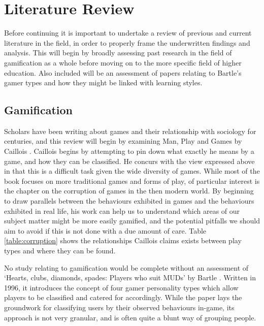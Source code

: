 \documentclass{article}
\begin{document}
\section{Literature Review}
Before continuing it is important to undertake a review of previous and current literature in the field, in order to properly frame the underwritten findings and analysis. This will begin by broadly assessing past research in the field of gamification as a whole before moving on to the more specific field of higher education. Also included will be an assessment of papers relating to Bartle's gamer types and how they might be linked with learning styles.

\subsection{Gamification}
Scholars have been writing about games and their relationship with sociology for centuries, and this review will begin by examining Man, Play and Games by Caillois \cite{caillois1961man}. Caillois begins by attempting to pin down what exactly he means by a game, and how they can be classified. He concurs with the view expressed above in that this is a difficult task given the wide diversity of games. While most of the book focuses on more traditional games and forms of play, of particular interest is the chapter on the corruption of games in the then modern world. By beginning to draw parallels between the behaviours exhibited in games and the behaviours exhibited in real life, his work can help us to understand which areas of our subject matter might be more easily gamified, and the potential pitfalls we should aim to avoid if this is not done with a due amount of care. Table \ref{table:corruption} shows the relationships Caillois claims exists between play types and where they can be found.

No study relating to gamification would be complete without an assessment of `Hearts, clubs, diamonds, spades: Players who suit MUDs' by Bartle \cite{bartle1996hearts}. Written in 1996, it introduces the concept of four gamer personality types which allow players to be classified and catered for accordingly. While the paper lays the groundwork for classifying users by their observed behaviours in-game, its approach is not very granular, and is often quite a blunt way of grouping people.
\end{document}
